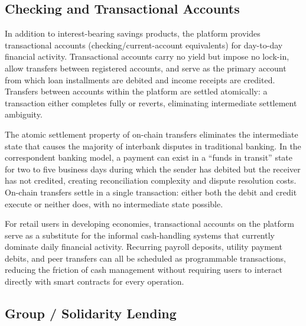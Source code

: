 \documentclass[12pt,a4paper]{report}
\begin{document}
\subsection{Checking and Transactional Accounts}

In addition to interest-bearing savings products, the platform provides transactional accounts (checking/current-account equivalents) for day-to-day financial activity. Transactional accounts carry no yield but impose no lock-in, allow transfers between registered accounts, and serve as the primary account from which loan installments are debited and income receipts are credited. Transfers between accounts within the platform are settled atomically: a transaction either completes fully or reverts, eliminating intermediate settlement ambiguity.

The atomic settlement property of on-chain transfers eliminates the intermediate state that causes the majority of interbank disputes in traditional banking. In the correspondent banking model, a payment can exist in a ``funds in transit'' state for two to five business days during which the sender has debited but the receiver has not credited, creating reconciliation complexity and dispute resolution costs. On-chain transfers settle in a single transaction: either both the debit and credit execute or neither does, with no intermediate state possible.

For retail users in developing economies, transactional accounts on the platform serve as a substitute for the informal cash-handling systems that currently dominate daily financial activity. Recurring payroll deposits, utility payment debits, and peer transfers can all be scheduled as programmable transactions, reducing the friction of cash management without requiring users to interact directly with smart contracts for every operation.

\subsection{Group / Solidarity Lending}
\end{document}
